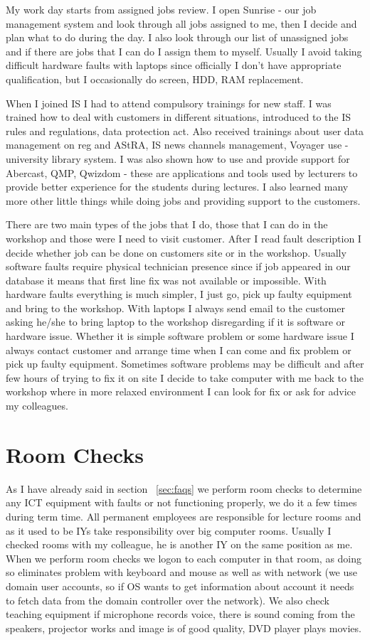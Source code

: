 \documentclass[10pt,a4paper,headinclude=true]{report}
\begin{document}
My work day starts from assigned jobs review. I open Sunrise - our job management system and look through all jobs assigned to me, then I decide and plan what to do during the day. I also look through our list of unassigned jobs and if there are jobs that I can do I assign them to myself. Usually I avoid taking difficult hardware faults with laptops since officially I don't have appropriate qualification, but I occasionally do screen, HDD, RAM replacement.

When I joined IS I had to attend compulsory trainings for new staff. I was trained how to deal with customers in different situations, introduced to the IS rules and regulations, data protection act. Also received trainings about user data management on reg and AStRA, IS news channels management, Voyager use - university library system. I was also shown how to use and provide support for Abercast, QMP, Qwizdom - these are applications and tools used by lecturers to provide better experience for the students during lectures. I also learned many more other little things while doing jobs and providing support to the customers.

There are two main types of the jobs that I do, those that I can do in the workshop and those were I need to visit customer. After I read fault description I decide whether job can be done on customers site or in the workshop. Usually software faults require physical technician presence since if job appeared in our database it means that first line fix was not available or impossible. With hardware faults everything is much simpler, I just go, pick up faulty equipment and bring to the workshop. With laptops I always send email to the customer asking he/she to bring laptop to the workshop disregarding if it is software or hardware issue. Whether it is simple software problem or some hardware issue I always contact customer and arrange time when I can come and fix problem or pick up faulty equipment. Sometimes software problems may be difficult and after few hours of trying to fix it on site I decide to take computer with me back to the workshop where in more relaxed environment I can look for fix or ask for advice my colleagues.

\section{Room Checks}
As I have already said in section ~\ref{sec:faqs} we perform room checks to determine any ICT equipment with faults or not functioning properly, we do it a few times during term time. All permanent employees are responsible for lecture rooms and as it used to be IYs take responsibility over big computer rooms. Usually I checked rooms with my colleague, he is another IY on the same position as me. When we perform room checks we logon to each computer in that room, as doing so eliminates problem with keyboard and mouse as well as with network (we use domain user accounts, so if OS wants to get information about account it needs to fetch data from the domain controller over the network). We also check teaching equipment if microphone records voice, there is sound coming from the speakers, projector works and image is of good quality, DVD player plays movies.  
\end{document}
